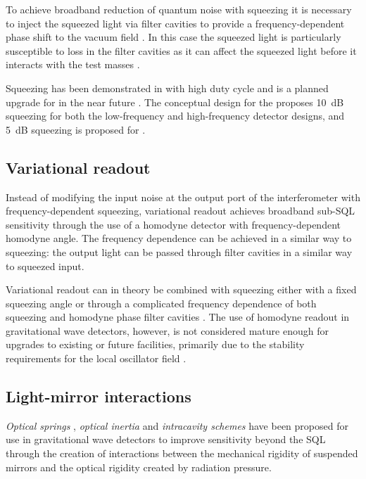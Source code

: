 To achieve broadband reduction of quantum noise with squeezing it is necessary to inject the squeezed light via filter cavities to provide a frequency-dependent phase shift to the vacuum field \cite{Kimble2001}. In this case the squeezed light is particularly susceptible to loss in the filter cavities as it can affect the squeezed light before it interacts with the test masses \cite{Kwee2014}.

Squeezing has been demonstrated in \GEOHF{} with high duty cycle \cite{Grote2013} and is a planned upgrade for \ALIGO{} in the near future \cite{Miller2015}. The conceptual design for the \ET{} proposes \SI{10}{\deci\bel} squeezing for both the low-frequency and high-frequency detector designs, and \SI{5}{\deci\bel} squeezing is proposed for \LIGOCE{}.

\subsection{Variational readout}
Instead of modifying the input noise at the output port of the interferometer with frequency-dependent squeezing, variational readout achieves broadband sub-\gls{SQL} sensitivity through the use of a homodyne detector with frequency-dependent homodyne angle. The frequency dependence can be achieved in a similar way to squeezing: the output light can be passed through filter cavities in a similar way to squeezed input.

Variational readout can in theory be combined with squeezing either with a fixed squeezing angle \cite{Buonanno2004} or through a complicated frequency dependence of both squeezing and homodyne phase filter cavities \cite{Harms2003}. The use of homodyne readout in gravitational wave detectors, however, is not considered mature enough for upgrades to existing or future facilities, primarily due to the stability requirements for the local oscillator field \cite{Steinlechner2015}.

\subsection{Light-mirror interactions}
\emph{Optical springs} \cite{Braginsky1999, Buonanno2002, Corbitt2007, Rehbein2008, Gordon2015}, \emph{optical inertia} \cite{Khalili2011, Voronchev2012} and \emph{intracavity schemes} \cite{Braginsky1997, Khalili2002, Danilishin2006} have been proposed for use in gravitational wave detectors to improve sensitivity beyond the \gls{SQL} through the creation of interactions between the mechanical rigidity of suspended mirrors and the optical rigidity created by radiation pressure.

